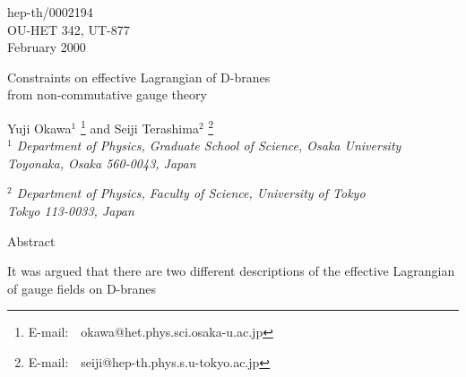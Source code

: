 \documentclass[a4paper,12pt]{article}
\begin{document}
\baselineskip=0.7cm
\renewcommand{\theequation}{\arabic{section}.\arabic{equation}}
\renewcommand{\thesection}{\arabic{section}.}
\renewcommand{\thesubsection}{\arabic{section}.\arabic{subsection}}
\makeatletter
\def\section{\@startsection{section}{1}{\z@}{-3.5ex plus -1ex minus
 -.2ex}{2.3ex plus .2ex}{\large}}
\def\subsection{\@startsection{subsection}{2}{\z@}{-3.25ex plus -1ex minus
 -.2ex}{1.5ex plus .2ex}{\normalsize\it}}
\def\appendix{
\par
\setcounter{section}{0}
\setcounter{subsection}{0}
\def\thesection{\Alph{section}}}
\makeatother
\def\thefootnote{\fnsymbol{footnote}}
\begin{flushright}
hep-th/0002194\\
OU-HET 342, UT-877
\\
February 2000
\end{flushright}
\vspace{1cm}
\begin{center}
\Large
Constraints on effective Lagrangian of D-branes\\ from
non-commutative gauge theory

\vspace{1cm}
\normalsize
{\sc Yuji Okawa}${}^1$
\footnote{
E-mail:\ \ okawa@het.phys.sci.osaka-u.ac.jp}
and 
{\sc Seiji Terashima}${}^2$
\footnote{
E-mail:\ \ seiji@hep-th.phys.s.u-tokyo.ac.jp}
\\

\vspace{0.3cm}
{\it ${}^1$ Department of Physics,
Graduate School of Science, Osaka University\\
Toyonaka, Osaka 560-0043, Japan}

\vspace{0.3cm}
{\it ${}^2$ Department of Physics,
Faculty of Science, University of Tokyo\\
Tokyo 113-0033, Japan}

\vspace{1.3cm}
Abstract\\

\end{center}
It was argued that
there are two different descriptions of
the effective Lagrangian of gauge fields on D-branes
\end{document}
